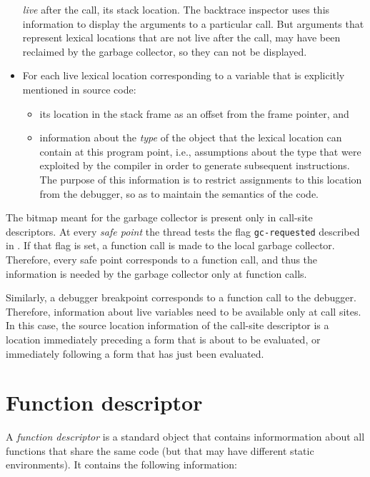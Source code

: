 \begin{itemize}
  \emph{live} after the call, its stack location.  The backtrace
  inspector uses this information to display the arguments to a
  particular call.  But arguments that represent lexical locations
  that are not live after the call, may have been reclaimed by the
  garbage collector, so they can not be displayed.
\item For each live lexical location corresponding to a variable that
  is explicitly mentioned in source code:
  \begin{itemize}
  \item its location in the stack frame as an offset from the frame
    pointer, and
  \item information about the \emph{type} of the object that the
    lexical location can contain at this program point, i.e.,
    assumptions about the type that were exploited by the compiler in
    order to generate subsequent instructions.  The purpose of this
    information is to restrict assignments to this location from the
    debugger, so as to maintain the semantics of the code.
  \end{itemize}
\end{itemize}

The bitmap meant for the garbage collector is present only in
call-site descriptors. At every \emph{safe point} the thread tests the
flag \texttt{gc-requested} described in
.
If that flag is set, a function call is made to the local garbage
collector.  Therefore, every safe point corresponds to a function
call, and thus the information is needed by the garbage collector only
at function calls.

Similarly, a debugger breakpoint corresponds to a function call to the
debugger.  Therefore, information about live variables need to be
available only at call sites.  In this case, the source location
information of the call-site descriptor is a location immediately
preceding a form that is about to be evaluated, or immediately
following a form that has just been evaluated.

\section{Function descriptor}
\label{data-representation-function-descriptor}

A \emph{function descriptor} is a standard object that contains
informormation about all functions that share the same code (but that
may have different static environments).  It contains the following
information:

